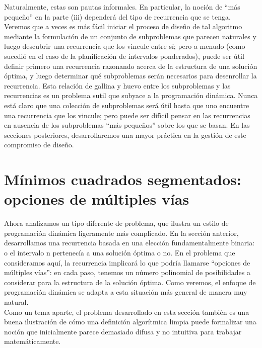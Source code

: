 \documentclass[a4paper, 12pt]{book}
\theoremstyle{dotless}
\begin{document}
Naturalmente, estas son pautas informales. En particular, la noción de ``más pequeño'' en la parte (iii) dependerá del tipo de recurrencia que se tenga.\\

Veremos que a veces es más fácil iniciar el proceso de diseño de tal algoritmo mediante la formulación de un conjunto de subproblemas que parecen naturales y luego descubrir una recurrencia que los vincule entre sí; pero a menudo (como sucedió en el caso de la planificación de intervalos ponderados), puede ser útil definir primero una recurrencia razonando acerca de la estructura de una solución óptima, y ​​luego determinar qué subproblemas serán necesarios para desenrollar la recurrencia. Esta relación de gallina y huevo entre los subproblemas y las recurrencias es un problema sutil que subyace a la programación dinámica. Nunca está claro que una colección de subproblemas será útil hasta que uno encuentre una recurrencia que los vincule; pero puede ser difícil pensar en las recurrencias en ausencia de los subproblemas ``más pequeños'' sobre los que se basan. En las secciones posteriores, desarrollaremos una mayor práctica en la gestión de este compromiso de diseño.\\

\section{Mínimos cuadrados segmentados: opciones de múltiples vías}

Ahora analizamos un tipo diferente de problema, que ilustra un estilo de programación dinámica ligeramente más complicado. En la sección anterior, desarrollamos una recurrencia basada en una elección fundamentalmente binaria: o el intervalo n pertenecía a una solución óptima o no. En el problema que consideramos aquí, la recurrencia implicará lo que podría llamarse ``opciones de múltiples vías'': en cada paso, tenemos un número polinomial de posibilidades a considerar para la estructura de la solución óptima. Como veremos, el enfoque de programación dinámica se adapta a esta situación más general de manera muy natural.\\

Como un tema aparte, el problema desarrollado en esta sección también es una buena ilustración de cómo una definición algorítmica limpia puede formalizar una noción que inicialmente parece demasiado difusa y no intuitiva para trabajar matemáticamente.\\
\end{document}
